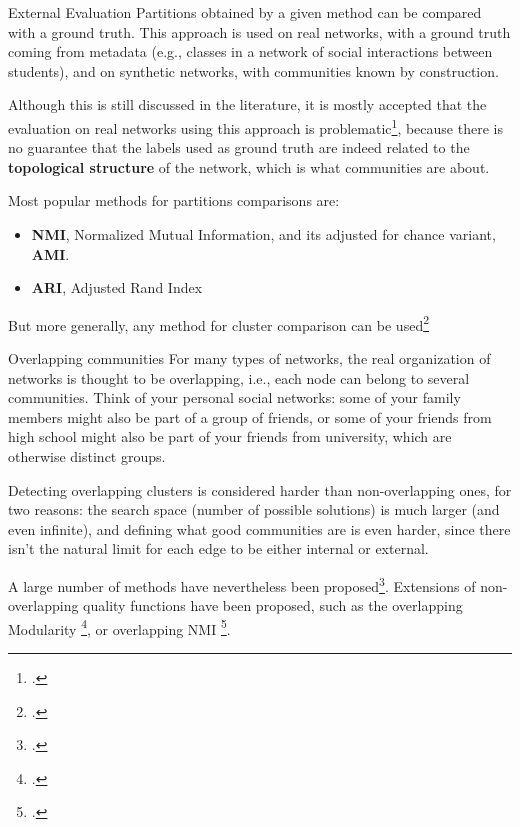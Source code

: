 \begin{textbox}{External Evaluation}
Partitions obtained by a given method can be compared with a ground truth. This approach is used on real networks, with a ground truth coming from metadata (e.g., classes in a network of social interactions between students), and on synthetic networks, with communities known by construction.

Although this is still discussed in the literature, it is mostly accepted that the evaluation on real networks using this approach is problematic\footcite{peel2017ground}, because there is no guarantee that the labels used as ground truth are indeed related to the \textbf{topological structure} of the network, which is what communities are about.

Most popular methods for partitions comparisons are:
\begin{itemize}
\item \textbf{NMI}, Normalized Mutual Information, and its adjusted for chance variant, \textbf{AMI}.
\item \textbf{ARI}, Adjusted Rand Index
\end{itemize}
But more generally, any method for cluster comparison can be used\footcite{dao2020community}
\end{textbox}


\begin{textbox}{Overlapping communities}
For many types of networks, the real organization of networks is thought to be overlapping, i.e., each node can belong to several communities. Think of your personal social networks: some of your family members might also be part of a group of friends, or some of your friends from high school might also be part of your friends from university, which are otherwise distinct groups. 

Detecting overlapping clusters is considered harder than non-overlapping ones, for two reasons: the search space (number of possible solutions) is much larger (and even infinite), and defining what good communities are is even harder, since there isn't the natural limit for each edge to be either internal or external.

A large number of methods have nevertheless been proposed\footcite{xie2013overlapping}. Extensions of non-overlapping quality functions have been proposed, such as the overlapping Modularity \footcite{nicosia2009extending}, or overlapping NMI \footcite{mcdaid2011normalized}.
\end{textbox}

